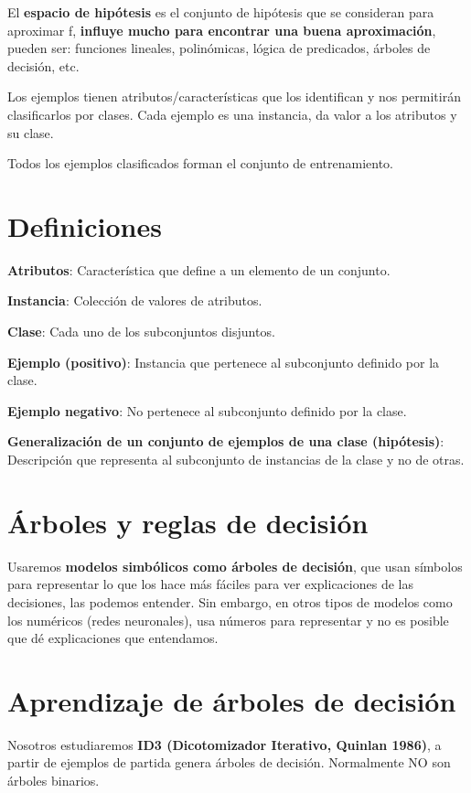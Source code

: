 \documentclass[12pt, twoside, openright]{report} %
\begin{document}
El \textbf{espacio de hipótesis} es el conjunto de hipótesis que se consideran para aproximar f, \textbf{influye mucho para encontrar una buena aproximación}, pueden ser: funciones lineales, polinómicas, lógica de predicados, árboles de decisión, etc.

Los ejemplos tienen atributos/características que los identifican y nos permitirán clasificarlos por clases. Cada ejemplo es una instancia, da valor a los atributos y su clase.

Todos los ejemplos clasificados forman el conjunto de entrenamiento.

\section{Definiciones}

\textbf{Atributos}: Característica que define a un elemento de un conjunto.

\textbf{Instancia}: Colección de valores de atributos.

\textbf{Clase}: Cada uno de los subconjuntos disjuntos.

\textbf{Ejemplo (positivo)}: Instancia que pertenece al subconjunto definido por la clase.

\textbf{Ejemplo negativo}: No pertenece al subconjunto definido por la clase.

\textbf{Generalización de un conjunto de ejemplos de una clase (hipótesis)}: Descripción que representa al subconjunto de instancias de la clase y no de otras.

\section{Árboles y reglas de decisión}

Usaremos \textbf{modelos simbólicos como árboles de decisión}, que usan símbolos para representar lo que los hace más fáciles para ver explicaciones de las decisiones, las podemos entender. Sin embargo, en otros tipos de modelos como los numéricos (redes neuronales), usa números para representar y no es posible que dé explicaciones que entendamos.

\section{Aprendizaje de árboles de decisión}

Nosotros estudiaremos \textbf{ID3 (Dicotomizador Iterativo, Quinlan 1986)}, a partir de ejemplos de partida genera árboles de decisión. Normalmente NO son árboles binarios.
\end{document}
